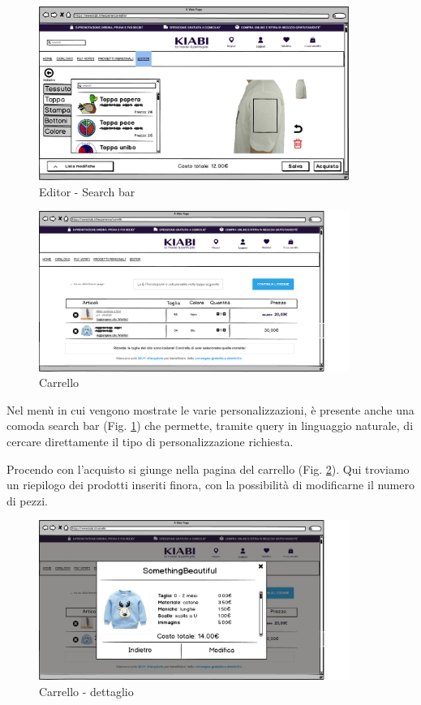 \documentclass[12pt,italian,]{report}
\begin{document}
\begin{figure}[h]
\centering
\includegraphics[width=0.9\textwidth]{../balsamiq/balsamiq_finale/Editor-caratteristicamanichetoppa.png}
\caption{Editor - Search bar}
\label{searchbar}
\end{figure}

\begin{figure}[h]
\centering
\includegraphics[width=0.9\textwidth]{../balsamiq/balsamiq_finale/Carrello.png}
\caption{Carrello}
\label{carrello}
\end{figure}

Nel menù in cui vengono mostrate le varie personalizzazioni, è presente anche una comoda search bar (Fig. \ref{searchbar}) che permette, tramite query in linguaggio naturale, di cercare direttamente il tipo di personalizzazione richiesta.

Procendo con l'acquisto si giunge nella pagina del carrello (Fig. \ref{carrello}). Qui
troviamo un riepilogo dei prodotti inseriti finora, con la possibilità
di modificarne il numero di pezzi.


\begin{figure}[ht]
\centering
\includegraphics[width=0.9\textwidth]{../balsamiq/balsamiq_finale/Carrellodettagli.png}
\caption{Carrello - dettaglio}
\label{carr-dett}
\end{figure}
\end{document}
